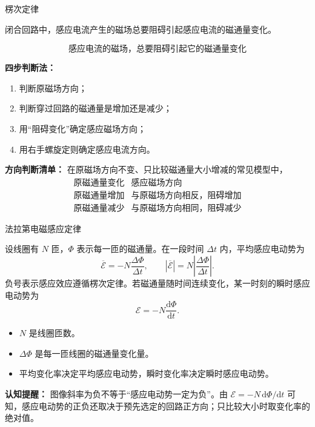 \begin{conceptbox}{楞次定律}

闭合回路中，感应电流产生的磁场总要阻碍引起感应电流的磁通量变化。

\[
\boxed{\text{感应电流的磁场，总要阻碍引起它的磁通量变化}}
\]

\begin{center}


\label{fig:lenz-law-magnet}
\end{center}

\textbf{四步判断法：}
\begin{enumerate}
  \item 判断原磁场方向；
  \item 判断穿过回路的磁通量是增加还是减少；
  \item 用“阻碍变化”确定感应磁场方向；
  \item 用右手螺旋定则确定感应电流方向。
\end{enumerate}

\textbf{方向判断清单：} 在原磁场方向不变、只比较磁通量大小增减的常见模型中，
\[
\begin{array}{c|c}
\text{原磁通量变化} & \text{感应磁场方向} \\
\hline
\text{原磁通量增加} & \text{与原磁场方向相反，阻碍增加} \\
\text{原磁通量减少} & \text{与原磁场方向相同，阻碍减少}
\end{array}
\]

\end{conceptbox}

\begin{conceptbox}{法拉第电磁感应定律}

设线圈有 $N$ 匝，$\Phi$ 表示每一匝的磁通量。在一段时间 $\Delta t$ 内，平均感应电动势为
\[
\boxed{\overline{\mathcal E}=-N\frac{\Delta\Phi}{\Delta t}},
\qquad
\boxed{\left|\overline{\mathcal E}\right|=N\left|\frac{\Delta\Phi}{\Delta t}\right|}.
\]
负号表示感应效应遵循楞次定律。若磁通量随时间连续变化，某一时刻的瞬时感应电动势为
\[
\boxed{\mathcal E=-N\frac{\mathrm d\Phi}{\mathrm dt}}.
\]

\begin{itemize}
  \item $N$ 是线圈匝数。
  \item $\Delta\Phi$ 是每一匝线圈的磁通量变化量。
  \item 平均变化率决定平均感应电动势，瞬时变化率决定瞬时感应电动势。
\end{itemize}

\begin{center}


\label{fig:faraday-flux-time}
\end{center}

\textbf{认知提醒：} 图像斜率为负不等于“感应电动势一定为负”。由 $\mathcal E=-N\,\mathrm d\Phi/\mathrm dt$ 可知，感应电动势的正负还取决于预先选定的回路正方向；只比较大小时取变化率的绝对值。

\end{conceptbox}

